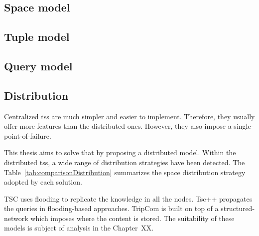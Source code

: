 %


\subsection{Space model}


\subsection{Tuple model}


\subsection{Query model}


\subsection{Distribution} %

Centralized \aclp{ts} are much simpler and easier to implement.
Therefore, they usually offer more features than the distributed ones.
However, they also impose a single-point-of-failure.

This thesis aims to solve that by proposing a distributed model.
Within the distributed \aclp{ts}, a wide range of distribution strategies have been detected.
The Table~\ref{tab:comparisonDistribution} summarizes the space distribution strategy adopted by each solution.

TSC uses flooding to replicate the knowledge in all the nodes.
Tsc++ propagates the queries in flooding-based approaches.
TripCom is built on top of a structured-network which imposes where the content is stored.
The suitability of these models is subject of analysis in the Chapter~XX.






